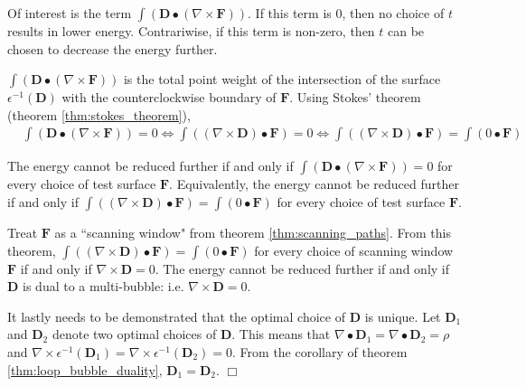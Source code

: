 Of interest is the term \(\int (\mathbf{D} \bullet (\nabla \times \mathbf{F}))\). If this term is \(0\), then no choice of \(t\) results in lower energy. Contrariwise, if this term is non-zero, then \(t\) can be chosen to decrease the energy further. 

\(\int (\mathbf{D} \bullet (\nabla \times \mathbf{F}))\) is the total point weight of the intersection of the surface \(\epsilon^{-1}(\mathbf{D})\) with the counterclockwise boundary of \(\mathbf{F}\). Using Stokes' theorem (theorem \ref{thm:stokes_theorem}), 
\begin{align*}
& \int (\mathbf{D} \bullet (\nabla \times \mathbf{F})) = 0
\iff \int ((\nabla \times \mathbf{D}) \bullet \mathbf{F}) = 0 
\iff \int ((\nabla \times \mathbf{D}) \bullet \mathbf{F}) = \int (0 \bullet \mathbf{F}) 
\end{align*}

The energy cannot be reduced further if and only if \(\int (\mathbf{D} \bullet (\nabla \times \mathbf{F})) = 0\) for every choice of test surface \(\mathbf{F}\). Equivalently, the energy cannot be reduced further if and only if \(\int ((\nabla \times \mathbf{D}) \bullet \mathbf{F}) = \int (0 \bullet \mathbf{F})\) for every choice of test surface \(\mathbf{F}\).

Treat \(\mathbf{F}\) as a ``scanning window" from theorem \ref{thm:scanning_paths}. From this theorem, \(\int ((\nabla \times \mathbf{D}) \bullet \mathbf{F}) = \int (0 \bullet \mathbf{F})\) for every choice of scanning window \(\mathbf{F}\) if and only if \(\nabla \times \mathbf{D} = 0\). The energy cannot be reduced further if and only if \(\mathbf{D}\) is dual to a multi-bubble: i.e. \(\nabla \times \mathbf{D} = 0\).

It lastly needs to be demonstrated that the optimal choice of \(\mathbf{D}\) is unique. Let \(\mathbf{D}_1\) and \(\mathbf{D}_2\) denote two optimal choices of \(\mathbf{D}\). This means that \(\nabla \bullet \mathbf{D}_1 = \nabla \bullet \mathbf{D}_2 = \rho\) and \(\nabla \times \epsilon^{-1}(\mathbf{D}_1) = \nabla \times \epsilon^{-1}(\mathbf{D}_2) = 0\). From the corollary of theorem \ref{thm:loop_bubble_duality}, \(\mathbf{D}_1 = \mathbf{D}_2\). \(\Box\) 

